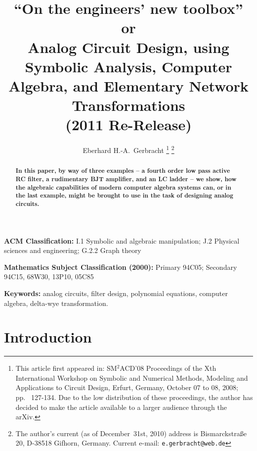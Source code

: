 \documentclass[10pt,twocolumn,pagenumbers]{IEEEtran}
\begin{document}
\title{\Large ``On the engineers' new toolbox''\\
or\\
Analog Circuit Design, using Symbolic Analysis, Computer Algebra, and Elementary Network Transformations\\
{\large (2011 Re-Release)}
}

\author{{\large Eberhard H.-A.\ Gerbracht
\thanks{This article first appeared in: SM$^2$ACD'08 Proceedings of the Xth International Workshop on Symbolic and Numerical Methods, Modeling and Applications to Circuit Design, Erfurt, Germany, October 07 to 08, 2008; pp.~ 127-134. Due to the low distribution of these proceedings, the author has decided to make the article available to a larger audience through the arXiv.}
\thanks{The author's current (as of December~31st, 2010) address is Bismarckstra\ss e 20, D-38518 Gifhorn, Germany. Current e-mail: \tt{e.gerbracht@web.de}}}}
 
\maketitle
\thispagestyle{empty}

\bigskip

\begin{abstract}
\noindent
{\small \bf
In this paper, by way of three examples -- a fourth order low pass active RC filter, a rudimentary BJT amplifier, and an LC ladder -- we show, how the algebraic capabilities of modern computer algebra systems can, or in the last example, might be brought to use in the task of designing analog circuits.
}
\end{abstract}


{\small
\noindent
{\bf ACM Classification:} I.1 Symbolic and algebraic manipulation; J.2 Physical sciences and engineering; G.2.2 Graph theory
\smallskip

\noindent
{\bf Mathematics Subject Classification (2000):} Primary 94C05; Secondary 94C15, 68W30, 13P10, 05C85
\smallskip

\noindent
{\bf Keywords:} analog circuits, filter design, polynomial equations, computer algebra, delta-wye transformation.
}

\section{Introduction}
\end{document}

